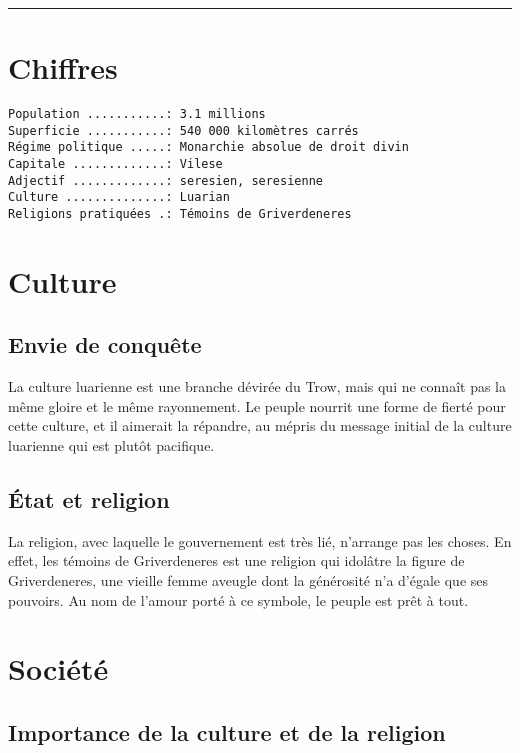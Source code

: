 \documentclass[french, a4paper, 12pt]{article}
\begin{document}
 \maketitle \vspace{3pt} \hrule \vspace{3pt}

\section{Chiffres}

\begin{verbatim}
Population ...........: 3.1 millions
Superficie ...........: 540 000 kilomètres carrés
Régime politique .....: Monarchie absolue de droit divin
Capitale .............: Vilese
Adjectif .............: seresien, seresienne
Culture ..............: Luarian
Religions pratiquées .: Témoins de Griverdeneres
\end{verbatim}

\section{Culture}


\subsection{Envie de conquête}

La culture luarienne est une branche dévirée du Trow, mais qui ne connaît pas la même gloire et le même rayonnement. Le peuple nourrit une forme de fierté pour cette culture, et il aimerait la répandre, au mépris du message initial de la culture luarienne qui est plutôt pacifique.

\subsection{État et religion}

La religion, avec laquelle le gouvernement est très lié, n'arrange pas les choses. En effet, les témoins de Griverdeneres est une religion qui idolâtre la figure de Griverdeneres, une vieille femme aveugle dont la générosité n'a d'égale que ses pouvoirs. Au nom de l'amour porté à ce symbole, le peuple est prêt à tout.

\section{Société}

\subsection{Importance de la culture et de la religion}
\end{document}
